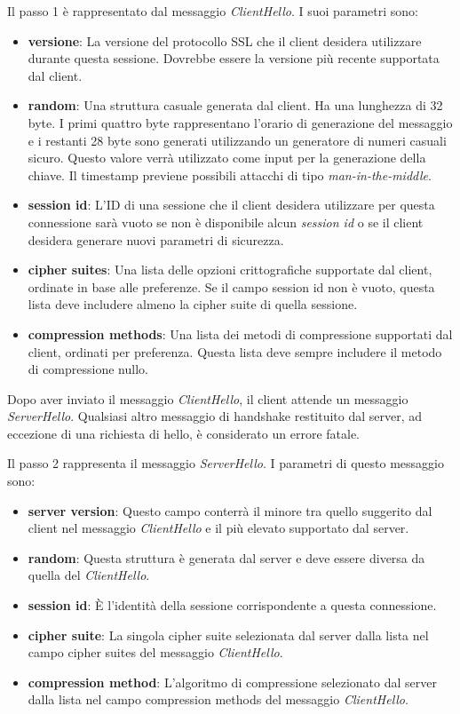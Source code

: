 \documentclass{article}
\theoremstyle{definition}
\begin{document}
Il passo 1 è rappresentato dal messaggio \textit{ClientHello}. I suoi parametri sono:
\begin{itemize}
    \item \textbf{versione}: La versione del protocollo SSL che il client desidera utilizzare durante questa sessione. Dovrebbe essere la versione più recente supportata dal client.
    \item \textbf{random}: Una struttura casuale generata dal client. Ha una lunghezza di 32 byte. I primi quattro byte rappresentano l'orario di generazione del messaggio e i restanti 28 byte sono generati utilizzando un generatore di numeri casuali sicuro. Questo valore verrà utilizzato come input per la generazione della chiave. Il timestamp previene possibili attacchi di tipo \textit{man-in-the-middle}.
    \item \textbf{session id}: L'ID di una sessione che il client desidera utilizzare per questa connessione sarà vuoto se non è disponibile alcun \textit{session id} o se il client desidera generare nuovi parametri di sicurezza.
    \item \textbf{cipher suites}: Una lista delle opzioni crittografiche supportate dal client, ordinate in base alle preferenze. Se il campo session id non è vuoto, questa lista deve includere almeno la cipher suite di quella sessione.
    \item \textbf{compression methods}: Una lista dei metodi di compressione supportati dal client, ordinati per preferenza. Questa lista deve sempre includere il metodo di compressione nullo. 
\end{itemize}

Dopo aver inviato il messaggio \textit{ClientHello}, il client attende un messaggio \textit{ServerHello}. Qualsiasi altro messaggio di handshake restituito dal server, ad eccezione di una richiesta di hello, è considerato un errore fatale.

Il passo 2 rappresenta il messaggio \textit{ServerHello}. I parametri di questo messaggio sono:
\begin{itemize}
    \item \textbf{server version}: Questo campo conterrà il minore tra quello suggerito dal client nel messaggio \textit{ClientHello} e il più elevato supportato dal server.
    \item \textbf{random}: Questa struttura è generata dal server e deve essere diversa da quella del \textit{ClientHello}.
    \item \textbf{session id}: È l'identità della sessione corrispondente a questa connessione.
    \item \textbf{cipher suite}: La singola cipher suite selezionata dal server dalla lista nel campo cipher suites del messaggio \textit{ClientHello}.
    \item \textbf{compression method}: L'algoritmo di compressione selezionato dal server dalla lista nel campo compression methods del messaggio \textit{ClientHello}.
\end{itemize}
\end{document}
